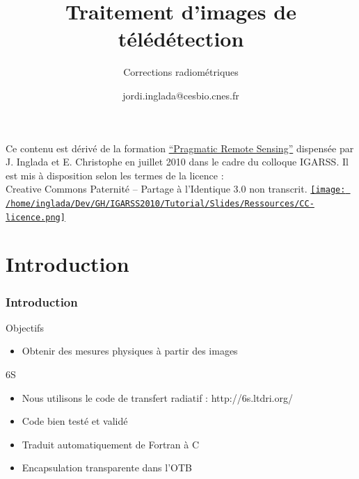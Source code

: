 \documentclass[compress]{beamer}
\title{Traitement d'images de télédétection}
\subtitle{Corrections radiométriques}
\author
{jordi.inglada@cesbio.cnes.fr}
\institute[Cesbio] %
{\textsc{Centre d'Études Spatiales de la Biosphère, Toulouse, France}}
\date{}
\begin{document}
\begin{frame}
  \titlepage
  \begin{center}
{\tiny Ce contenu est dérivé de la formation \href{http://www.orfeo-toolbox.org/packages/PragmaticRemoteSensing-handout.pdf}{``Pragmatic Remote
  Sensing''} dispensée par J. Inglada et E. Christophe en juillet 2010
  dans le cadre du colloque IGARSS. Il est mis à disposition selon les termes de la licence :\\
Creative Commons Paternité – Partage à l’Identique 3.0 non transcrit.} \href{http://creativecommons.org/licenses/by-sa/3.0/}{\texttt{[image: /home/inglada/Dev/GH/IGARSS2010/Tutorial/Slides/Ressources/CC-licence.png]}}    
  \end{center}
\end{frame}

\section*{Introduction}

\begin{frame}

  \frametitle{Introduction}
  \begin{block}{Objectifs}
   \begin{itemize}
   \item Obtenir des mesures physiques à partir des images
   \end{itemize}
  \end{block}
  \begin{block}{6S}
   \begin{itemize}
    \item Nous utilisons le code de transfert radiatif : http://6s.ltdri.org/
    \item Code bien testé et validé
    \item Traduit automatiquement de Fortran à C
    \item Encapsulation transparente dans l'OTB
   \end{itemize}
  \end{block}

\end{frame}
\end{document}
